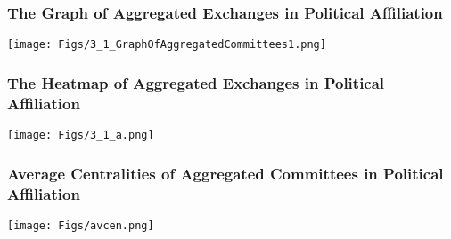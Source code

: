 \documentclass{beamer}
\begin{document}
\begin{frame}
\frametitle{The Graph of Aggregated Exchanges in Political Affiliation}

\begin{center}
\texttt{[image: Figs/3\_1\_GraphOfAggregatedCommittees1.png]} \hspace*{4cm}
\end{center}

\end{frame}



\begin{frame}
\frametitle{The Heatmap of Aggregated Exchanges in Political Affiliation}
\vspace{-0.3cm}
\begin{center}
\texttt{[image: Figs/3\_1\_a.png]} \hspace*{4cm}
\end{center}

\end{frame}




\begin{frame}
\frametitle{\small Average Centralities of Aggregated Committees in Political Affiliation}

\begin{center}
\texttt{[image: Figs/avcen.png]} \hspace*{4cm}
\end{center}

\end{frame}
\end{document}
